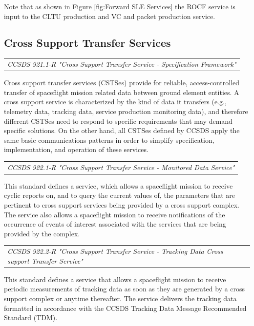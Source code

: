 Note that as shown in Figure \ref{fig:Forward SLE Services} the ROCF service is input to the CLTU production and VC and packet production service.

\subsection{Cross Support Transfer Services}

\begin{tabular}{l}
\textit{CCSDS 921.1-R "Cross Support Transfer Service - Specification Framework" \cite{CCSDS-921.1-R}} \\
\end{tabular}

Cross support transfer services (CSTSes) provide for reliable, access-controlled transfer of spaceflight mission related data between ground element entities. A cross support service is characterized by the kind of data it transfers (e.g., telemetry data,  tracking data, service production monitoring data), and therefore different CSTSes need  to respond to specific requirements that may demand specific solutions. On the other hand, all CSTSes defined by CCSDS  apply the same basic communications patterns in order  to simplify specification, implementation, and operation of these services.  

\begin{tabular}{l}
\textit{CCSDS 922.1-R "Cross Support Transfer Service - Monitored Data Service" \cite{CCSDS-922.1-R}} \\
\end{tabular}

This standard defines a service, which allows a spaceflight mission to receive cyclic reports on, and to query the current values of, the parameters that are pertinent to cross support services being provided by a cross support complex. The service also allows a spaceflight mission to receive notifications of the occurrence of events of interest associated with the services that are being provided by the complex.

\begin{tabular}{l}
\textit{CCSDS 922.2-R "Cross Support Transfer Service - Tracking Data Cross support Transfer Service" \cite{CCSDS-922.2-R}} \\
\end{tabular}

This standard defines a service that allows a spaceflight mission to receive periodic measurements of tracking data as soon as they are generated by a cross support complex or anytime thereafter. The service delivers the tracking data formatted in accordance with the CCSDS Tracking Data Message Recommended Standard (TDM).

